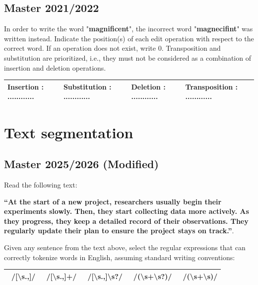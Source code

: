 \documentclass{../extra/aakpract/aakpract}
\begin{document}
	\subsection{Master 2021/2022}
	
	In order to write the word "\textbf{magnificent}", the incorrect word "\textbf{magnecifint}" was written instead. 
	Indicate the position(s) of each edit operation with respect to the correct word. 
	If an operation does not exist, write 0. 
	Transposition and substitution are prioritized, i.e., they must not be considered as a combination of insertion and deletion operations.
	
	\begin{center}
		\begin{tabular}{|llll|}
			\hline 
			Insertion : ............ & Substitution  : ............ &
			Deletion  : ............ & Transposition : ............ \\
			\hline
		\end{tabular}
	\end{center}
	
	
	\section{Text segmentation}
	
	\subsection{Master 2025/2026 (Modified)}
	
	Read the following text: 
	
	\textbf{``At the start of a new project, researchers usually begin their experiments slowly. Then, they start collecting data more actively. As they progress, they keep a detailed record of their observations. They regularly update their plan to ensure the project stays on track.''}.
	
	Given any sentence from the text above, select the regular expressions that can correctly tokenize words in English, assuming standard writing conventions:
	\begin{center}
		\begin{tabular}{|lllll|}
			\hline
			\Square\ /[\textbackslash s.,]/ & 
			\Square\ /[\textbackslash s.,]+/ & 
			\Square\ /[\textbackslash s.,]\textbackslash s?/ & 
			\Square\ /(\textbackslash s+\textbar[.,]\textbackslash s?)/ &
			\Square\ /(\textbackslash s+\textbar[.,]\textbackslash s)/ \\
			\hline
		\end{tabular}
	\end{center}
	
\end{document}
